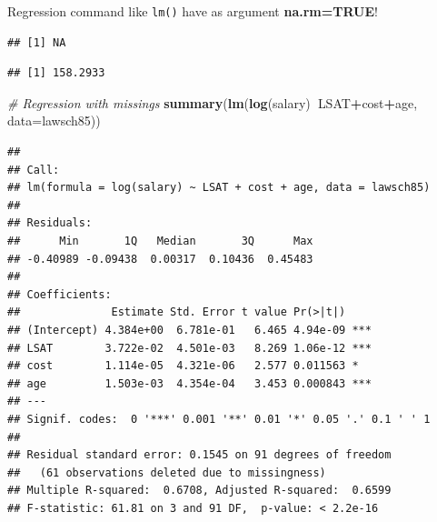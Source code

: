 \documentclass[]{book}
\newenvironment{Shaded}{\begin{snugshade}}{\end{snugshade}}
\newcommand{\CommentTok}[1]{\textcolor[rgb]{0.56,0.35,0.01}{\textit{#1}}}
\newcommand{\DataTypeTok}[1]{\textcolor[rgb]{0.13,0.29,0.53}{#1}}
\newcommand{\KeywordTok}[1]{\textcolor[rgb]{0.13,0.29,0.53}{\textbf{#1}}}
\newcommand{\NormalTok}[1]{#1}
\newcommand{\OperatorTok}[1]{\textcolor[rgb]{0.81,0.36,0.00}{\textbf{#1}}}
\newcommand{\OtherTok}[1]{\textcolor[rgb]{0.56,0.35,0.01}{#1}}
\begin{document}
Regression command like \texttt{lm()} have as argument
\textbf{na.rm=TRUE}!

\begin{Shaded}
\end{Shaded}

\begin{verbatim}
## [1] NA
\end{verbatim}

\begin{Shaded}
\end{Shaded}

\begin{verbatim}
## [1] 158.2933
\end{verbatim}

\begin{Shaded}
\begin{Highlighting}[]
\CommentTok{# Regression with missings}
\KeywordTok{summary}\NormalTok{(}\KeywordTok{lm}\NormalTok{(}\KeywordTok{log}\NormalTok{(salary)}\OperatorTok{~}\NormalTok{LSAT}\OperatorTok{+}\NormalTok{cost}\OperatorTok{+}\NormalTok{age, }\DataTypeTok{data=}\NormalTok{lawsch85))}
\end{Highlighting}
\end{Shaded}

\begin{verbatim}
## 
## Call:
## lm(formula = log(salary) ~ LSAT + cost + age, data = lawsch85)
## 
## Residuals:
##      Min       1Q   Median       3Q      Max 
## -0.40989 -0.09438  0.00317  0.10436  0.45483 
## 
## Coefficients:
##              Estimate Std. Error t value Pr(>|t|)    
## (Intercept) 4.384e+00  6.781e-01   6.465 4.94e-09 ***
## LSAT        3.722e-02  4.501e-03   8.269 1.06e-12 ***
## cost        1.114e-05  4.321e-06   2.577 0.011563 *  
## age         1.503e-03  4.354e-04   3.453 0.000843 ***
## ---
## Signif. codes:  0 '***' 0.001 '**' 0.01 '*' 0.05 '.' 0.1 ' ' 1
## 
## Residual standard error: 0.1545 on 91 degrees of freedom
##   (61 observations deleted due to missingness)
## Multiple R-squared:  0.6708, Adjusted R-squared:  0.6599 
## F-statistic: 61.81 on 3 and 91 DF,  p-value: < 2.2e-16
\end{verbatim}
\end{document}
